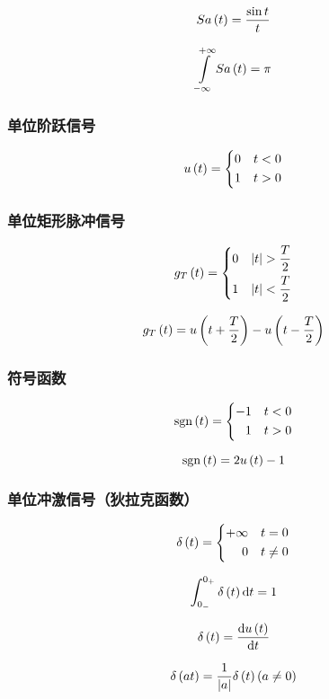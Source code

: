 \documentclass{article}
\begin{document}
\[Sa\left(t\right)=\frac{\sin t}t\]

\[\impint Sa\p{t}=\pi\]

\subsubsection{单位阶跃信号}

\[u\left(t\right)=
    \left\{\begin{aligned}
        0 &  & t<0 \\
        1 &  & t>0
    \end{aligned}\right.\]

\subsubsection{单位矩形脉冲信号}

\[g_T\p{t}=
    \left\{\begin{aligned}
        0 &  & \abs{t}>\frac T2 \\
        1 &  & \abs{t}<\frac T2
    \end{aligned}\right.\]

\[g_T\left(t\right)=u\left(t+\frac T2\right)-u\left(t-\frac T2\right)\]

\subsubsection{符号函数}

\[\mathrm{sgn}\left(t\right)=
    \left\{\begin{aligned}
        -1 &  & t<0 \\
        1  &  & t>0
    \end{aligned}\right.\]

\[\mathrm{sgn}\left(t\right)=2u\left(t\right)-1\]

\subsubsection{单位冲激信号（狄拉克函数）}

\[\delta\left(t\right)=
    \left\{\begin{aligned}
        +\infty &  & t=0    \\
        0       &  & t\neq0
    \end{aligned}\right.\]

\[\int_{0_-}^{0_+}\delta\left(t\right)\mathrm d t=1\]

\[\delta\left(t\right)=\frac{\mathrm d u\left(t\right)}{\mathrm d t}\]

\[\delta\left(at\right)=\frac1{\left|a\right|}\delta\left(t\right)\left(a\neq0\right)\]
\end{document}
